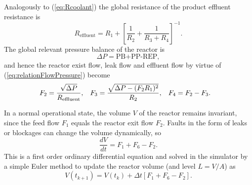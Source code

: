 \documentclass[10pt, conference, compsocconf]{IEEEtran}
\newcommand{\refeq}[1]{(\ref{eq:#1})}
\begin{document}
Analogously to \refeq{Rcoolant} the global resistance of the product
effluent resistance is
\begin{equation}
R_{\text{effluent}} =
	R_{1}+\left[\frac{1}{R_{2}}+\frac{1}{R_{3}+R_{4}}\right]^{-1}.
\label{eq:Reff}
\end{equation}
The global relevant pressure balance of the reactor is
\begin{equation*}
\Delta P = \text{PB+PP-REP},
\label{eq:reactorpressurebal}
\end{equation*}
and hence the reactor exist flow, leak flow and effluent flow
by virtue of \refeq{relationFlowPressure} become
\begin{align*}
F_{2} & = \frac{\sqrt{\Delta P}}{R_{\text{effluent}}},
\hspace{0.3cm} %
F_{3} = \frac{\sqrt{\Delta P - (F_{2}R_{1})^{2}}}{R_{2}},
\hspace{0.3cm} %
F_{4} = F_{2}-F_{3}. %
\label{eq:reactormassbal}
\end{align*}

In a normal operational state, the volume $V$ of the reactor remains
invariant, since the feed flow $F_{1}$ equals the reactor exit flow $F_{2}$.
Faults in the form of leaks or blockages can change the volume dynamically, so
\begin{equation}
\frac{dV}{dt} = F_{1}+F_{6}-F_{2}.
\label{eq:reactorvolbal}
\end{equation}
This is a first order ordinary differential equation
and solved in the simulator by a simple Euler method
to update the reactor volume (and level $L=V/A$) as
\begin{equation*}
V(t_{k+1}) = V(t_{k}) + \Delta t \left[F_{1}+F_{6}-F_{2}\right].
\label{eq:updatevolapprox}
\end{equation*}
\end{document}
